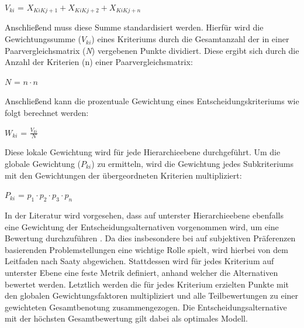  \vspace{-6mm}
 \begin{center}
	$V_{ki}$ = $X_{KiKj+1}+X_{KiKj+2}+X_{KiKj+n}$	
 \end{center}
Anschließend muss diese Summe standardisiert werden. Hierfür wird die Gewichtungssumme ($V_{ki}$) eines Kriteriums durch die Gesamtanzahl der in einer Paarvergleichsmatrix (\textit{N}) vergebenen Punkte dividiert. Diese ergibt sich durch die Anzahl der Kriterien (n) einer Paarvergleichsmatrix:
\vspace{-2mm}
\begin{center}
   $N$ = $ n \cdot n $	
\end{center}
Anschließend kann die prozentuale Gewichtung eines Entscheidungskriteriums wie folgt berechnet werden:
 \vspace{-2mm}
 \begin{center}
	$W_{ki}$ = $\frac{V_{ki}}{N}$	
 \end{center}
Diese lokale Gewichtung wird für jede Hierarchieebene durchgeführt. Um die globale Gewichtung ($P_{ki}$) zu ermitteln, wird die Gewichtung jedes Subkriteriums mit den Gewichtungen der übergeordneten Kriterien  multipliziert:
\vspace{-2mm}
 \begin{center}
	$P_{ki}$ = $p_{1} \cdot p_{2} \cdot p_{3} \cdot p_{n} $	
 \end{center}
In der Literatur wird vorgesehen, dass auf unterster Hierarchieebene ebenfalls eine Gewichtung der Entscheidungsalternativen vorgenommen wird, um eine Bewertung durchzuführen \cite[86]{Saaty.2008}. Da dies insbesondere bei auf subjektiven Präferenzen basierenden Problemstellungen eine wichtige Rolle spielt, wird hierbei von dem Leitfaden nach Saaty abgewichen. Stattdessen wird für jedes Kriterium auf unterster Ebene eine feste Metrik definiert, anhand welcher die Alternativen bewertet werden. Letztlich werden die für jedes Kriterium erzielten Punkte mit den globalen Gewichtungsfaktoren multipliziert und alle Teilbewertungen zu einer gewichteten Gesamtbenotung zusammengezogen. Die Entscheidungsalternative mit der höchsten Gesamtbewertung gilt dabei als optimales Modell. 
